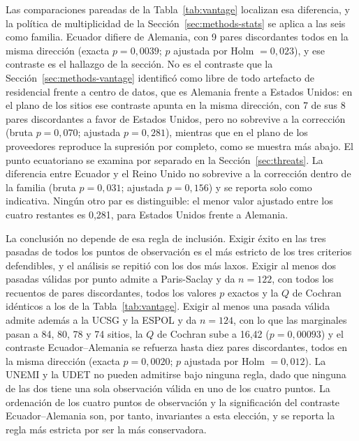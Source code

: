 \documentclass[pdflatex,sn-basic,Numbered,iicol]{sn-jnl}
\theoremstyle{thmstyleone}
\theoremstyle{thmstyletwo}
\theoremstyle{thmstylethree}
\begin{document}
Las comparaciones pareadas de la Tabla~\ref{tab:vantage} localizan esa diferencia, y la pol\'itica de multiplicidad de la Secci\'on~\ref{sec:methods-stats} se aplica a las seis como familia. Ecuador difiere de Alemania, con 9 pares discordantes todos en la misma direcci\'on (exacta $p=0{,}0039$; $p$ ajustada por Holm $=0{,}023$), y ese contraste es el hallazgo de la secci\'on. No es el contraste que la Secci\'on~\ref{sec:methods-vantage} identific\'o como libre de todo artefacto de residencial frente a centro de datos, que es Alemania frente a Estados Unidos: en el plano de los sitios ese contraste apunta en la misma direcci\'on, con 7 de sus 8 pares discordantes a favor de Estados Unidos, pero no sobrevive a la correcci\'on (bruta $p=0{,}070$; ajustada $p=0{,}281$), mientras que en el plano de los proveedores reproduce la supresi\'on por completo, como se muestra m\'as abajo. El punto ecuatoriano se examina por separado en la Secci\'on~\ref{sec:threats}. La diferencia entre Ecuador y el Reino Unido no sobrevive a la correcci\'on dentro de la familia (bruta $p=0{,}031$; ajustada $p=0{,}156$) y se reporta solo como indicativa. Ning\'un otro par es distinguible: el menor valor ajustado entre los cuatro restantes es 0,281, para Estados Unidos frente a Alemania.

La conclusi\'on no depende de esa regla de inclusi\'on. Exigir \'exito en las tres pasadas de todos los puntos de observaci\'on es el m\'as estricto de los tres criterios defendibles, y el an\'alisis se repiti\'o con los dos m\'as laxos. Exigir al menos dos pasadas v\'alidas por punto admite a Paris-Saclay y da $n=122$, con todos los recuentos de pares discordantes, todos los valores $p$ exactos y la $Q$ de Cochran id\'enticos a los de la Tabla~\ref{tab:vantage}. Exigir al menos una pasada v\'alida admite adem\'as a la UCSG y la ESPOL y da $n=124$, con lo que las marginales pasan a 84, 80, 78 y 74 sitios, la $Q$ de Cochran sube a 16,42 ($p=0{,}00093$) y el contraste Ecuador--Alemania se refuerza hasta diez pares discordantes, todos en la misma direcci\'on (exacta $p=0{,}0020$; $p$ ajustada por Holm $=0{,}012$). La UNEMI y la UDET no pueden admitirse bajo ninguna regla, dado que ninguna de las dos tiene una sola observaci\'on v\'alida en uno de los cuatro puntos. La ordenaci\'on de los cuatro puntos de observaci\'on y la significaci\'on del contraste Ecuador--Alemania son, por tanto, invariantes a esta elecci\'on, y se reporta la regla m\'as estricta por ser la m\'as conservadora.
\end{document}

